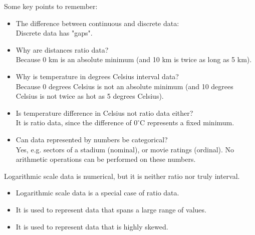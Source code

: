 \begin{remark}
    Some key points to remember:
    \begin{itemize}
        \item The difference between continuous and discrete data: \\
            Discrete data has "gaps".
        \item Why are distances ratio data? \\
            Because 0 km is an absolute minimum (and 10 km is twice as long as 5 km).
        \item Why is temperature in degrees Celsius interval data? \\
            Because 0 degrees Celsius is not an absolute minimum (and 10 degrees Celsius is not twice as hot as 5 
            degrees Celsius).
        \item Is temperature difference in Celsius not ratio data either? \\
            It is ratio data, since the difference of $0^\circ$C represents a fixed minimum.
        \item Can data represented by numbers be categorical? \\
            Yes, e.g. sectors of a stadium (nominal), or movie ratings (ordinal).
            No arithmetic operations can be performed on these numbers.
    \end{itemize}
\end{remark}

\begin{remark}
    Logarithmic scale data is numerical, but it is neither ratio nor truly interval.
    \begin{itemize}
        \item Logarithmic scale data is a special case of ratio data.
        \item It is used to represent data that spans a large range of values.
        \item It is used to represent data that is highly skewed.
    \end{itemize}
\end{remark}

